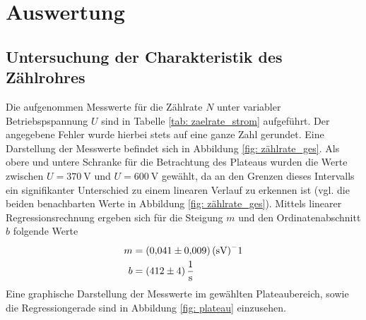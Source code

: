 \section{Auswertung}


\subsection{Untersuchung der Charakteristik des Zählrohres}
Die aufgenommen Messwerte für die Zählrate $N$ unter variabler Betriebspspannung $U$ sind
in Tabelle \ref{tab: zaelrate_strom} aufgeführt. Der angegebene Fehler wurde hierbei stets
auf eine ganze Zahl gerundet. Eine Darstellung der Messwerte befindet sich in Abbildung \ref{fig: zählrate_ges}.
Als obere und untere Schranke für die Betrachtung des Plateaus wurden die Werte zwischen $U = \SI{370}{\volt}$
und $U = \SI{600}{\volt}$ gewählt, da an den Grenzen dieses Intervalls ein signifikanter Unterschied zu einem
linearen Verlauf zu erkennen ist (vgl. die beiden benachbarten Werte in Abbildung \ref{fig: zählrate_ges}). Mittels linearer %
Regressionsrechnung ergeben sich für die Steigung $m$ und den Ordinatenabschnitt $b$ folgende Werte
\begin{align}
  m &= \SI{0.041 \pm 0.009}{(\second\volt)^-1} \\
  b &= \SI{412 \pm 4}{\per\second}
\end{align}%
Eine graphische Darstellung der Messwerte im gewählten Plateaubereich, sowie die Regressiongerade sind in
Abbildung \ref{fig: plateau} einzusehen.

